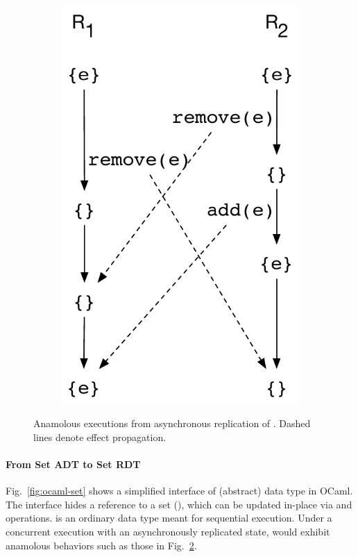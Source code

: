 \begin{figure}[ht]
\begin{subfigure}[t]{0.44\columnwidth}
    \includegraphics[scale=0.35]{Figures/crdt-execs-2}
    \caption{}
    \label{fig:crdt-exec-2}
  \end{subfigure}
\caption{Anamolous executions from asynchronous
  replication of . Dashed lines denote effect propagation.}
\label{fig:crdt-execs}
\end{figure}

\noindent\paragraph{From Set ADT to Set RDT} Fig.~\ref{fig:ocaml-set}
shows a simplified interface of  (abstract) data type in OCaml.
The interface hides a reference to a set (), which can be
updated in-place via  and  operations.  is an
ordinary data type meant for sequential execution. Under a
concurrent execution with an asynchronously replicated state, 
would exhibit anamolous behaviors such as those in
Fig.~\ref{fig:crdt-execs}.

